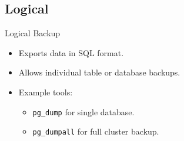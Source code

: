 \documentclass[aspectratio=169]{beamer}
\begin{document}
\subsection{Logical}

\begin{frame}{Logical Backup}
    \begin{itemize}
        \item Exports data in SQL format.
        \item Allows individual table or database backups.
        \item Example tools:
        \begin{itemize}
            \item \texttt{pg\_dump} for single database.
            \item \texttt{pg\_dumpall} for full cluster backup.
        \end{itemize}
    \end{itemize}
\end{frame}
\end{document}
